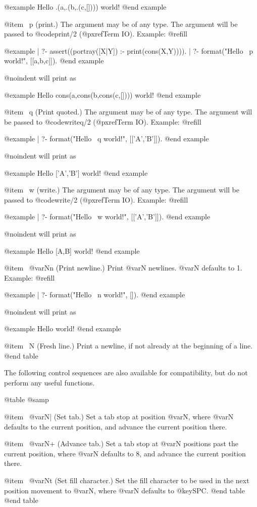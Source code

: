 @example
Hello .(a,.(b,.(c,[]))) world!
@end example

@item ~p
(print.) The argument may be of any type.  The argument will be passed to
@code{print/2} (@pxref{Term IO}).  Example: @refill

@example
| ?- assert((portray([X|Y]) :- print(cons(X,Y)))).
| ?- format("Hello ~p world!", [[a,b,c]]).
@end example

@noindent
will print as

@example
Hello cons(a,cons(b,cons(c,[]))) world!
@end example

@item ~q
(Print quoted.) The argument may be of any type.  The argument will be
passed to @code{writeq/2} (@pxref{Term IO}).  Example: @refill

@example
| ?- format("Hello ~q world!", [['A','B']]).
@end example

@noindent
will print as

@example
Hello ['A','B'] world!
@end example

@item ~w
(write.) The argument may be of any type.  The argument will be passed to
@code{write/2} (@pxref{Term IO}).  Example: @refill

@example
| ?- format("Hello ~w world!", [['A','B']]).
@end example

@noindent
will print as

@example
Hello [A,B] world!
@end example

@item ~@var{N}n
(Print newline.) Print @var{N} newlines. @var{N} defaults to 1.
Example: @refill

@example
| ?- format("Hello ~n world!", []).
@end example

@noindent
will print as

@example
Hello
 world!
@end example

@item ~N
(Fresh line.) Print a newline, if not already at the beginning of a line.
@end table


The following control sequences are also available for compatibility,
but do not perform any useful functions.

@table @samp

@item ~@var{N}|
(Set tab.) Set a tab stop at position @var{N}, where @var{N} defaults to
the current position, and advance the current position there.

@item ~@var{N}+
(Advance tab.) Set a tab stop at @var{N} positions past the current
position, where @var{N} defaults to 8, and advance the current position
there.

@item ~@var{N}t
(Set fill character.) Set the fill character to be used in the next
position movement to @var{N}, where @var{N} defaults to @key{SPC}.
@end table
@end table

